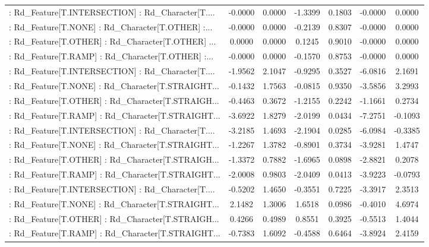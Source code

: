 \begin{longtable}{p{4cm}cccccc}
 : Rd\_Feature[T.INTERSECTION] : Rd\_Character[T.... & -0.0000 &    0.0000 & -1.3399 &       0.1803 & -0.0000 &  0.0000 \\
 : Rd\_Feature[T.NONE] : Rd\_Character[T.OTHER] :... & -0.0000 &    0.0000 & -0.2139 &       0.8307 & -0.0000 &  0.0000 \\
 : Rd\_Feature[T.OTHER] : Rd\_Character[T.OTHER] ... &  0.0000 &    0.0000 &  0.1245 &       0.9010 & -0.0000 &  0.0000 \\
 : Rd\_Feature[T.RAMP] : Rd\_Character[T.OTHER] :... & -0.0000 &    0.0000 & -0.1570 &       0.8753 & -0.0000 &  0.0000 \\
 : Rd\_Feature[T.INTERSECTION] : Rd\_Character[T.... & -1.9562 &    2.1047 & -0.9295 &       0.3527 & -6.0816 &  2.1691 \\
 : Rd\_Feature[T.NONE] : Rd\_Character[T.STRAIGHT... & -0.1432 &    1.7563 & -0.0815 &       0.9350 & -3.5856 &  3.2993 \\
 : Rd\_Feature[T.OTHER] : Rd\_Character[T.STRAIGH... & -0.4463 &    0.3672 & -1.2155 &       0.2242 & -1.1661 &  0.2734 \\
 : Rd\_Feature[T.RAMP] : Rd\_Character[T.STRAIGHT... & -3.6922 &    1.8279 & -2.0199 &       0.0434 & -7.2751 & -0.1093 \\
 : Rd\_Feature[T.INTERSECTION] : Rd\_Character[T.... & -3.2185 &    1.4693 & -2.1904 &       0.0285 & -6.0984 & -0.3385 \\
 : Rd\_Feature[T.NONE] : Rd\_Character[T.STRAIGHT... & -1.2267 &    1.3782 & -0.8901 &       0.3734 & -3.9281 &  1.4747 \\
 : Rd\_Feature[T.OTHER] : Rd\_Character[T.STRAIGH... & -1.3372 &    0.7882 & -1.6965 &       0.0898 & -2.8821 &  0.2078 \\
 : Rd\_Feature[T.RAMP] : Rd\_Character[T.STRAIGHT... & -2.0008 &    0.9803 & -2.0409 &       0.0413 & -3.9223 & -0.0793 \\
 : Rd\_Feature[T.INTERSECTION] : Rd\_Character[T.... & -0.5202 &    1.4650 & -0.3551 &       0.7225 & -3.3917 &  2.3513 \\
 : Rd\_Feature[T.NONE] : Rd\_Character[T.STRAIGHT... &  2.1482 &    1.3006 &  1.6518 &       0.0986 & -0.4010 &  4.6974 \\
 : Rd\_Feature[T.OTHER] : Rd\_Character[T.STRAIGH... &  0.4266 &    0.4989 &  0.8551 &       0.3925 & -0.5513 &  1.4044 \\
 : Rd\_Feature[T.RAMP] : Rd\_Character[T.STRAIGHT... & -0.7383 &    1.6092 & -0.4588 &       0.6464 & -3.8924 &  2.4159 \\

\end{longtable}
